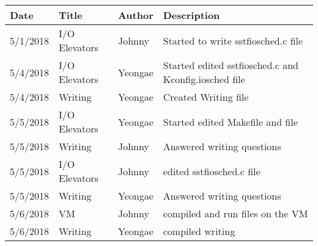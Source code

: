 \documentclass[10pt, letterpaper]{article}
\begin{document}
    \begin{tabular}{l l l l }
        \hline
         Date & Title & Author & Description \\
        \hline
         5/1/2018 & I/O Elevators & Johnny & Started to write sstf\-iosched.c file \\
         5/4/2018 & I/O Elevators & Yeongae  & Started edited sstf\-iosched.c and Kconfig.iosched file \\
         5/4/2018 & Writing & Yeongae & Created Writing file \\
         5/5/2018 & I/O Elevators & Yeongae & Started edited Makefile and  file \\
         5/5/2018 & Writing & Johnny & Answered writing questions \\
         5/5/2018 & I/O Elevators & Johnny & edited sstf\-iosched.c file \\
         5/5/2018 & Writing & Yeongae & Answered writing questions \\
         5/6/2018 & VM & Johnny & compiled and run files on the VM \\
         5/6/2018 & Writing & Yeongae & compiled writing \\
         \hline
    \end{tabular}
\end{document}
